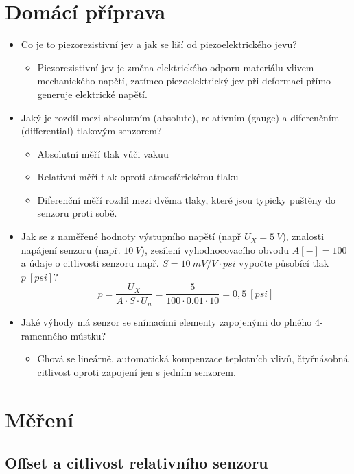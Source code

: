 \documentclass[a4paper,12pt]{article}
\begin{document}
\section{Domácí příprava}
\begin{itemize}
  \item Co je to piezorezistivní jev a jak se liší od piezoelektrického jevu?
    \begin{itemize}
      \item Piezorezistivní jev je změna elektrického odporu materiálu vlivem mechanického napětí, zatímco piezoelektrický jev při deformaci přímo generuje elektrické napětí.
    \end{itemize}

  \item Jaký je rozdíl mezi absolutním (absolute), relativním (gauge) a diferenčním (differential) tlakovým senzorem?
    \begin{itemize}
      \item Absolutní měří tlak vůči vakuu
      \item Relativní měří tlak oproti atmosférickému tlaku
      \item Diferenční měří rozdíl mezi dvěma tlaky, které jsou typicky puštěny do senzoru proti sobě.
    \end{itemize}
  \item Jak se z naměřené hodnoty výstupního napětí (např $U_X=5\ V$), znalosti napájení senzoru (např. $10\ V$), zesílení vyhodnocovacího obvodu $A[-] =100$ a údaje o citlivosti senzoru např. $S = 10\ mV/V\cdot psi$ vypočte působící tlak $p\ [psi]$?
    $$
      p = \frac{U_X}{A \cdot S \cdot U_n} = \frac{5}{100\cdot 0.01\cdot 10} = 0,5\ [psi]
    $$
  \item Jaké výhody má senzor se snímacími elementy zapojenými do plného 4-ramenného můstku?
    \begin{itemize}
      \item Chová se lineárně, automatická kompenzace teplotních vlivů, čtyřnásobná citlivost oproti zapojení jen s jedním senzorem.
    \end{itemize}
\end{itemize}

\newpage
\section{Měření}
\subsection{Offset a citlivost relativního senzoru}
\end{document}
